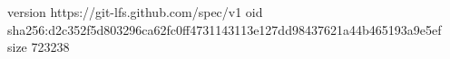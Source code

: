 version https://git-lfs.github.com/spec/v1
oid sha256:d2c352f5d803296ca62fc0ff4731143113e127dd98437621a44b465193a9e5ef
size 723238

